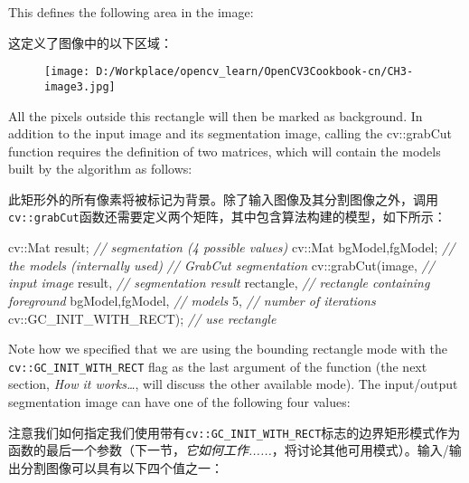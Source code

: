 \documentclass[]{article}
\newenvironment{Shaded}{}{}
\newcommand{\CommentTok}[1]{\textcolor[rgb]{0.38,0.63,0.69}{\textit{#1}}}
\newcommand{\DecValTok}[1]{\textcolor[rgb]{0.25,0.63,0.44}{#1}}
\newcommand{\NormalTok}[1]{#1}
\begin{document}
This defines the following area in the image:

这定义了图像中的以下区域：

\begin{figure}
\centering
\texttt{[image: D:/Workplace/opencv\_learn/OpenCV3Cookbook-cn/CH3-image3.jpg]}
\caption{}
\end{figure}

All the pixels outside this rectangle will then be marked as background.
In addition to the input image and its segmentation image, calling the
cv::grabCut function requires the definition of two matrices, which will
contain the models built by the algorithm as follows:

此矩形外的所有像素将被标记为背景。除了输入图像及其分割图像之外，调用\texttt{cv::grabCut}函数还需要定义两个矩阵，其中包含算法构建的模型，如下所示：

\begin{Shaded}
\begin{Highlighting}[]
\NormalTok{cv::Mat result; }\CommentTok{// segmentation (4 possible values)}
\NormalTok{cv::Mat bgModel,fgModel; }\CommentTok{// the models (internally used)}
\CommentTok{// GrabCut segmentation}
\NormalTok{cv::grabCut(image, }\CommentTok{// input image}
\NormalTok{            result, }\CommentTok{// segmentation result}
\NormalTok{            rectangle, }\CommentTok{// rectangle containing foreground}
\NormalTok{            bgModel,fgModel, }\CommentTok{// models}
            \DecValTok{5}\NormalTok{, }\CommentTok{// number of iterations}
\NormalTok{            cv::GC_INIT_WITH_RECT); }\CommentTok{// use rectangle}
\end{Highlighting}
\end{Shaded}

Note how we specified that we are using the bounding rectangle mode with
the \texttt{cv::GC\_INIT\_WITH\_RECT} flag as the last argument of the
function (the next section, \emph{How it works\ldots{}}, will discuss
the other available mode). The input/output segmentation image can have
one of the following four values:

注意我们如何指定我们使用带有\texttt{cv::GC\_INIT\_WITH\_RECT}标志的边界矩形模式作为函数的最后一个参数（下一节，\emph{它如何工作......}，将讨论其他可用模式）。输入/输出分割图像可以具有以下四个值之一：
\end{document}
